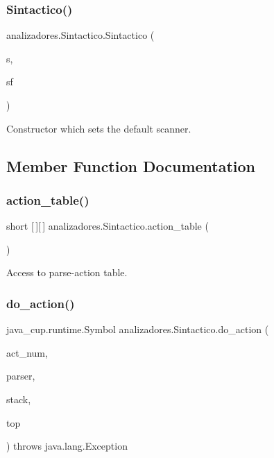\subsubsection{\texorpdfstring{Sintactico()}{Sintactico()}\hspace{0.1cm}{\footnotesize\ttfamily [3/3]}}
{\footnotesize\ttfamily analizadores.\+Sintactico.\+Sintactico (\begin{DoxyParamCaption}\item[{java\+\_\+cup.\+runtime.\+Scanner}]{s,  }\item[{java\+\_\+cup.\+runtime.\+Symbol\+Factory}]{sf }\end{DoxyParamCaption})}

Constructor which sets the default scanner. 

\subsection{Member Function Documentation}
\mbox{\label{classanalizadores_1_1_sintactico_a724ce0f5fa05d3b5d0f8e76ad5147291}} 
\subsubsection{\texorpdfstring{action\+\_\+table()}{action\_table()}}
{\footnotesize\ttfamily short \mbox{[}$\,$\mbox{]}\mbox{[}$\,$\mbox{]} analizadores.\+Sintactico.\+action\+\_\+table (\begin{DoxyParamCaption}{ }\end{DoxyParamCaption})}

Access to parse-\/action table. \mbox{\label{classanalizadores_1_1_sintactico_a9ea61235703a2be2386a93bda9080615}} 
\subsubsection{\texorpdfstring{do\+\_\+action()}{do\_action()}}
{\footnotesize\ttfamily java\+\_\+cup.\+runtime.\+Symbol analizadores.\+Sintactico.\+do\+\_\+action (\begin{DoxyParamCaption}\item[{int}]{act\+\_\+num,  }\item[{java\+\_\+cup.\+runtime.\+lr\+\_\+parser}]{parser,  }\item[{java.\+util.\+Stack}]{stack,  }\item[{int}]{top }\end{DoxyParamCaption}) throws java.\+lang.\+Exception}

